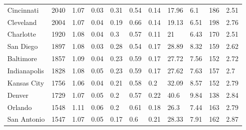 \documentclass{article}
\begin{document}
\begin{landscape}
\begin{table}
\begin{tabular}{p{2.5cm} p{1.5cm} p{1.5cm} p{1.5cm} p{1.55cm} p{1.5cm} p{1.5cm} p{1.5cm} p{1.5cm} p{1.5cm} p{1.5cm}}
Cincinnati           & 2040          & 1.07         & 0.03                       & 0.31           & 0.54        & 0.14        & 17.96                 & 6.1                   & 186                   & 2.51             \\
Cleveland            & 2004          & 1.07         & 0.04                       & 0.19           & 0.66        & 0.14        & 19.13                 & 6.51                  & 198                   & 2.76             \\
Charlotte            & 1920          & 1.08         & 0.04                       & 0.3            & 0.57        & 0.11        & 21                    & 6.43                  & 170                   & 2.51             \\
San Diego            & 1897          & 1.08         & 0.03                       & 0.28           & 0.54        & 0.17        & 28.89                 & 8.32                  & 159                   & 2.62             \\
Baltimore            & 1857          & 1.09         & 0.04                       & 0.23           & 0.59        & 0.17        & 27.72                 & 7.56                  & 152                   & 2.72             \\
Indianapolis         & 1828          & 1.08         & 0.05                       & 0.23           & 0.59        & 0.17        & 27.62                 & 7.63                  & 157                   & 2.7              \\
Kansas City          & 1756          & 1.06         & 0.04                       & 0.21           & 0.58        & 0.2         & 32.09                 & 8.57                  & 152                   & 2.79             \\
Denver               & 1729          & 1.07         & 0.05                       & 0.2            & 0.57        & 0.22        & 40.6                  & 9.84                  & 138                   & 2.84             \\
Orlando              & 1548          & 1.11         & 0.06                       & 0.2            & 0.61        & 0.18        & 26.3                  & 7.44                  & 163                   & 2.79             \\
San Antonio          & 1547          & 1.07         & 0.05                       & 0.17           & 0.6         & 0.21        & 28.33                 & 7.91                  & 162                   & 2.87             \\

\end{tabular}
\end{table}
\end{landscape}
\end{document}
